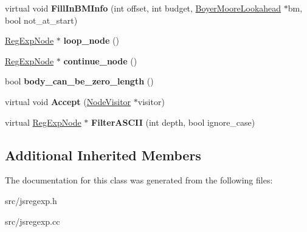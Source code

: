 \begin{DoxyCompactItemize}
\item 
\hypertarget{classv8_1_1internal_1_1_loop_choice_node_a9afaf1de44864b6d1a26bee827cde8c4}{}virtual void {\bfseries Fill\+In\+B\+M\+Info} (int offset, int budget, \hyperlink{classv8_1_1internal_1_1_boyer_moore_lookahead}{Boyer\+Moore\+Lookahead} $\ast$bm, bool not\+\_\+at\+\_\+start)\label{classv8_1_1internal_1_1_loop_choice_node_a9afaf1de44864b6d1a26bee827cde8c4}

\item 
\hypertarget{classv8_1_1internal_1_1_loop_choice_node_ab7302af501d9e4fc180be3c3531c308a}{}\hyperlink{classv8_1_1internal_1_1_reg_exp_node}{Reg\+Exp\+Node} $\ast$ {\bfseries loop\+\_\+node} ()\label{classv8_1_1internal_1_1_loop_choice_node_ab7302af501d9e4fc180be3c3531c308a}

\item 
\hypertarget{classv8_1_1internal_1_1_loop_choice_node_a16806e7a3a040882b1d268c01127e96c}{}\hyperlink{classv8_1_1internal_1_1_reg_exp_node}{Reg\+Exp\+Node} $\ast$ {\bfseries continue\+\_\+node} ()\label{classv8_1_1internal_1_1_loop_choice_node_a16806e7a3a040882b1d268c01127e96c}

\item 
\hypertarget{classv8_1_1internal_1_1_loop_choice_node_a2f44790afa263a24910170fdf12e6076}{}bool {\bfseries body\+\_\+can\+\_\+be\+\_\+zero\+\_\+length} ()\label{classv8_1_1internal_1_1_loop_choice_node_a2f44790afa263a24910170fdf12e6076}

\item 
\hypertarget{classv8_1_1internal_1_1_loop_choice_node_aa5078b0084b7659910a67f79b905045a}{}virtual void {\bfseries Accept} (\hyperlink{classv8_1_1internal_1_1_node_visitor}{Node\+Visitor} $\ast$visitor)\label{classv8_1_1internal_1_1_loop_choice_node_aa5078b0084b7659910a67f79b905045a}

\item 
\hypertarget{classv8_1_1internal_1_1_loop_choice_node_aef887e91e11fb94c7d1d104c6180bd15}{}virtual \hyperlink{classv8_1_1internal_1_1_reg_exp_node}{Reg\+Exp\+Node} $\ast$ {\bfseries Filter\+A\+S\+C\+I\+I} (int depth, bool ignore\+\_\+case)\label{classv8_1_1internal_1_1_loop_choice_node_aef887e91e11fb94c7d1d104c6180bd15}

\end{DoxyCompactItemize}
\subsection*{Additional Inherited Members}


The documentation for this class was generated from the following files\+:\begin{DoxyCompactItemize}
\item 
src/jsregexp.\+h\item 
src/jsregexp.\+cc\end{DoxyCompactItemize}
